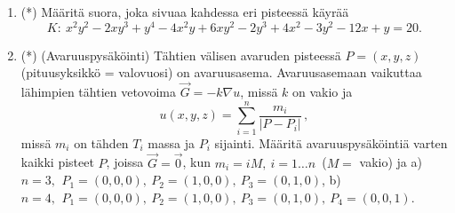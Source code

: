 \begin{enumerate}
\item (*)
Määritä suora, joka sivuaa kahdessa eri pisteessä käyrää
\[
K:\ x^2y^2-2xy^3+y^4-4x^2y+6xy^2-2y^3+4x^2-3y^2-12x+y=20.
\]

\item (*)
(Avaruuspysäköinti) Tähtien välisen avaruden pisteessä $P=(x,y,z)$ (pituusyksikkö = valovuosi)
on avaruusasema. Avaruusasemaan vaikuttaa lähimpien tähtien vetovoima $\vec G=-k\nabla u$,
missä $k$ on vakio ja
\[
u(x,y,z) = \sum_{i=1}^n \frac{m_i}{|P-P_i|}\,,
\]
missä $m_i$ on tähden $T_i$ massa ja $P_i$ sijainti. Määritä avaruuspysäköintiä varten kaikki
pisteet $P$, joissa $\vec G=\vec 0$, kun $m_i=iM,\ i=1 \ldots n\,$ ($M=$ vakio)
ja \vspace{1mm}\newline
a) \ $n=3,\,\ P_1=(0,0,0),\ P_2=(1,0,0),\ P_3=(0,1,0)$, \newline
b) \ $n=4,\,\ P_1=(0,0,0),\ P_2=(1,0,0),\ P_3=(0,1,0),\ P_4=(0,0,1)$. 
 
\end{enumerate}
